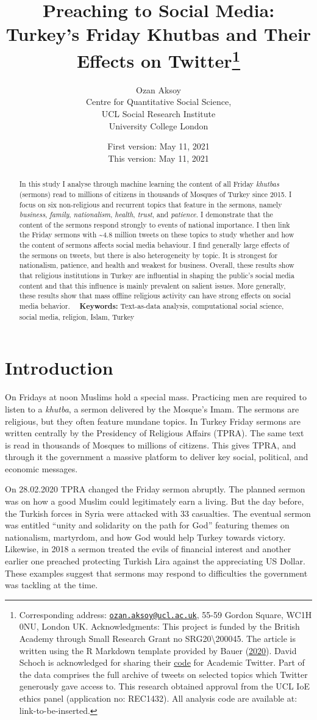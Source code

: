 \documentclass[
  12pt,
]{article}
\title{\vspace{1cm}Preaching to Social Media: Turkey's Friday Khutbas and Their Effects on Twitter\footnote{Corresponding address: \href{mailto:ozan.aksoy@ucl.ac.uk}{\nolinkurl{ozan.aksoy@ucl.ac.uk}}, 55-59 Gordon Square, WC1H 0NU, London UK. Acknowledgments: This project is funded by the British Academy through Small Research Grant no SRG20\textbackslash200045. The article is written using the R Markdown template provided by Bauer (\protect\hyperlink{ref-bauer2020writing}{2020}). David Schoch is acknowledged for sharing their \href{https://gist.github.com/schochastics/1ff42c0211916d73fc98ba8ad0dcb261}{code} for Academic Twitter. Part of the data comprises the full archive of tweets on selected topics which Twitter generously gave access to. This research obtained approval from the UCL IoE ethics panel (application no: REC1432). All analysis code are available at: link-to-be-inserted. }\vspace{0.5cm}\\}
\author{Ozan Aksoy\\
Centre for Quantitative Social Science,\\
UCL Social Research Institute\\
University College London}
\date{First version: May 11, 2021\\
This version: May 11, 2021}
\begin{document}
\maketitle
\begin{abstract}
\noindent{}In this study I analyse through machine learning the content of all Friday \emph{khutbas} (sermons) read to millions of citizens in thousands of Mosques of Turkey since 2015. I focus on six non-religious and recurrent topics that feature in the sermons, namely \emph{business}, \emph{family}, \emph{nationalism}, \emph{health}, \emph{trust}, and \emph{patience}. I demonstrate that the content of the sermons respond strongly to events of national importance. I then link the Friday sermons with \textasciitilde4.8 million tweets on these topics to study whether and how the content of sermons affects social media behaviour. I find generally large effects of the sermons on tweets, but there is also heterogeneity by topic. It is strongest for nationalism, patience, and health and weakest for business. Overall, these results show that religious institutions in Turkey are influential in shaping the public's social media content and that this influence is mainly prevalent on salient issues. More generally, these results show that mass offline religious activity can have strong effects on social media behavior. \newline~\newline~\textbf{Keywords:} Text-as-data analysis, computational social science, social media, religion, Islam, Turkey\vspace{.8cm}
\end{abstract}

\hypertarget{introduction}{%
\section{Introduction}\label{introduction}}

On Fridays at noon Muslims hold a special mass. Practicing men are required to listen to a \emph{khutba}, a sermon delivered by the Mosque's Imam. The sermons are religious, but they often feature mundane topics. In Turkey Friday sermons are written centrally by the Presidency of Religious Affairs (TPRA). The same text is read in thousands of Mosques to millions of citizens. This gives TPRA, and through it the government a massive platform to deliver key social, political, and economic messages.

On 28.02.2020 TPRA changed the Friday sermon abruptly. The planned sermon was on how a good Muslim could legitimately earn a living. But the day before, the Turkish forces in Syria were attacked with 33 casualties. The eventual sermon was entitled ``unity and solidarity on the path for God'' featuring themes on nationalism, martyrdom, and how God would help Turkey towards victory. Likewise, in 2018 a sermon treated the evils of financial interest and another earlier one preached protecting Turkish Lira against the appreciating US Dollar. These examples suggest that sermons may respond to difficulties the government was tackling at the time.
\end{document}
